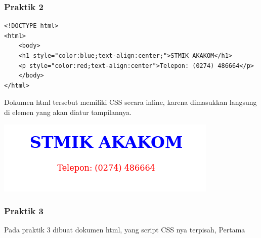 \documentclass[a4paper,12pt]{article}
\begin{document}
\subsubsection{Praktik 2}
\begin{lstlisting}
<!DOCTYPE html>
<html>
    <body>
    <h1 style="color:blue;text-align:center;">STMIK AKAKOM</h1>
    <p style="color:red;text-align:center">Telepon: (0274) 486664</p>
    </body>
</html>
\end{lstlisting}

Dokumen html tersebut memiliki CSS secara inline, karena dimasukkan langsung di elemen yang
 akan diatur tampilannya.
 \begin{center}
     \includegraphics[width=\linewidth]{2.png}
 \end{center}

 \subsubsection{Praktik 3}
 Pada praktik 3 dibuat dokumen html, yang script CSS nya terpisah, Pertama 

\newpage
\end{document}
